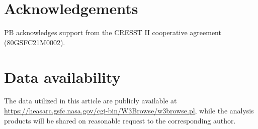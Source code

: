 \documentclass[fleqn,usenatbib]{mnras}
\begin{document}
\section*{Acknowledgements}
PB acknowledges support from the CRESST II cooperative agreement (80GSFC21M0002).

\section*{Data availability }
The data utilized in this article are publicly available at \href{https://heasarc.gsfc.nasa.gov/cgi-bin/W3Browse/w3browse.pl}{https://heasarc.gsfc.nasa.gov/cgi-bin/W3Browse/w3browse.pl}, while the analysis products will be shared on reasonable request to the corresponding author.













\bsp	%
\label{lastpage}
\end{document}
